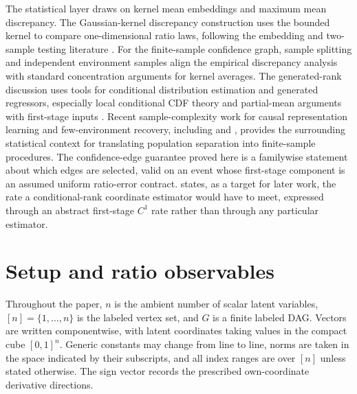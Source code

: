 \documentclass[11pt]{article}
\begin{document}
The statistical layer draws on kernel mean embeddings and maximum mean discrepancy. The Gaussian-kernel discrepancy construction uses the bounded kernel \leanref{sym:k(exp (-(a-b)^2), range (0,1])}{\ensuremath{k(a,b)=\exp(-(a-b)^2)}} to compare one-dimensional ratio laws, following the embedding and two-sample testing literature \citep{Sriperumbudur2010,Sriperumbudur2011,Gretton2007,Smola2007,GrettonEtAl2012KernelTwoSample,SchrabEtAl2023MMDAgg}. For the finite-sample confidence graph, sample splitting and independent environment samples align the empirical discrepancy analysis with standard concentration arguments for kernel averages. The generated-rank discussion uses tools for conditional distribution estimation and generated regressors, especially local conditional CDF theory and partial-mean arguments with first-stage inputs \citep{Xie2023UniformConditionalCDF,MammenRotheSchienle2012GeneratedCovariates,Lee2018PartialMeanGeneratedRegressors}. Recent sample-complexity work for causal representation learning and few-environment recovery, including \citet{AcarturkEtAl2024SampleComplexityCRL} and \citet{LeeJinAragam2026FewEnvironments}, provides the surrounding statistical context for translating population separation into finite-sample procedures. The confidence-edge guarantee proved here is a familywise statement about which edges are selected, valid on an event whose first-stage component is an assumed uniform ratio-error contract.  states, as a target for later work, the rate a conditional-rank coordinate estimator would have to meet, expressed through an abstract first-stage \(C^1\) rate rather than through any particular estimator.


\section{Setup and ratio observables}\label{sec:setup}

Throughout the paper, \(n\) is the ambient number of scalar latent variables, \([n]=\{1,\ldots,n\}\) is the labeled vertex set, and \(G\) is a finite labeled DAG. Vectors are written componentwise, with latent coordinates  taking values in the compact cube \([0,1]^n\). Generic constants may change from line to line, norms are taken in the space indicated by their subscripts, and all index ranges are over \([n]\) unless stated otherwise. The sign vector  records the prescribed own-coordinate derivative directions.
\end{document}
